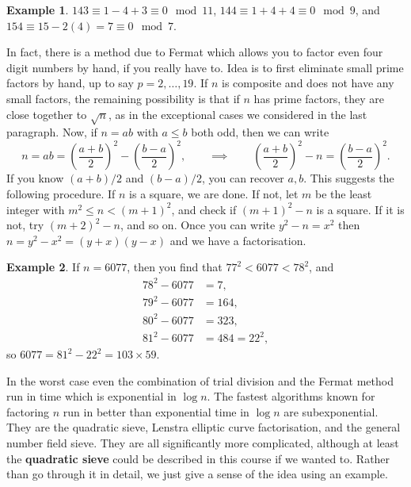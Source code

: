 \documentclass{article}
\newcommand{\rb}[1]{\left( #1 \right)}
\theoremstyle{definition}\newtheorem{definition}{Definition}
\theoremstyle{definition}\newtheorem*{remark}{Remark}
\theoremstyle{definition}\newtheorem*{example}{Example}
\theoremstyle{definition}\newtheorem*{note}{Note}
\begin{document}
\begin{example}
$ 143 \equiv 1 - 4 + 3 \equiv 0 \mod 11 $, $ 144 \equiv 1 + 4 + 4 \equiv 0 \mod 9 $, and $ 154 \equiv 15 - 2\rb{4} = 7 \equiv 0 \mod 7 $.
\end{example}


In fact, there is a method due to Fermat which allows you to factor even four digit numbers by hand, if you really have to. Idea is to first eliminate small prime factors by hand, up to say $ p = 2, \dots, 19 $. If $ n $ is composite and does not have any small factors, the remaining possibility is that if $ n $ has prime factors, they are close together to $ \sqrt{n} $, as in the exceptional cases we considered in the last paragraph. Now, if $ n = ab $ with $ a \le b $ both odd, then we can write
$$ n = ab = \rb{\dfrac{a + b}{2}}^2 - \rb{\dfrac{b - a}{2}}^2, \qquad \implies \qquad \rb{\dfrac{a + b}{2}}^2 - n = \rb{\dfrac{b - a}{2}}^2. $$
If you know $ \rb{a + b} / 2 $ and $ \rb{b - a} / 2 $, you can recover $ a, b $. This suggests the following procedure. If $ n $ is a square, we are done. If not, let $ m $ be the least integer with $ m^2 \le n < \rb{m + 1}^2 $, and check if $ \rb{m + 1}^2 - n $ is a square. If it is not, try $ \rb{m + 2}^2 - n $, and so on. Once you can write $ y^2 - n = x^2 $ then $ n = y^2 - x^2 = \rb{y + x}\rb{y - x} $ and we have a factorisation.

\begin{example}
If $ n  = 6077 $, then you find that $ 77^2 < 6077 < 78^2 $, and
\begin{align*}
78^2 - 6077 & = 7, \\
79^2 - 6077 & = 164, \\
80^2 - 6077 & = 323, \\
81^2 - 6077 & = 484 = 22^2,
\end{align*}
so $ 6077 = 81^2 - 22^2 = 103 \times 59 $.
\end{example}

In the worst case even the combination of trial division and the Fermat method run in time which is exponential in $ \log n $. The fastest algorithms known for factoring $ n $ run in better than exponential time in $ \log n $ are subexponential. They are the quadratic sieve, Lenstra elliptic curve factorisation, and the general number field sieve. They are all significantly more complicated, although at least the \textbf{quadratic sieve} could be described in this course if we wanted to. Rather than go through it in detail, we just give a sense of the idea using an example.
\end{document}
